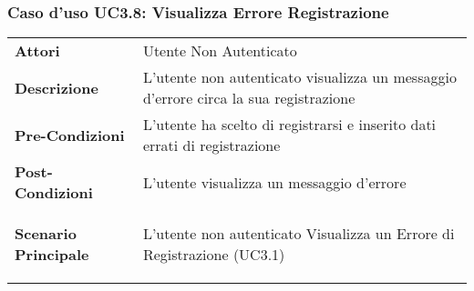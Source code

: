 \subsubsection{Caso d'uso UC3.8:  Visualizza Errore Registrazione}
\label{UC3_8}

\begin{longtable}{ l | p{11cm}}
	\hline
	\rowcolor{Gray}
	 \multicolumn{2}{c}{UC3.8 - Visualizza Errore Registrazione} \\
	 \hline
	\textbf{Attori} & Utente Non Autenticato \\
	\textbf{Descrizione} & L'utente non autenticato visualizza un messaggio d'errore circa la sua registrazione  \\
	\textbf{Pre-Condizioni} & L'utente ha scelto di registrarsi e inserito dati errati di registrazione \\
	\textbf{Post-Condizioni} & L'utente visualizza un messaggio d'errore \\
	\textbf{Scenario Principale} & \begin{enumerate*}[label=(\arabic*.),itemjoin={\newline}]
		\item L'utente non autenticato Visualizza un Errore di Registrazione (UC3.1)
	\end{enumerate*}\\
\end{longtable}
